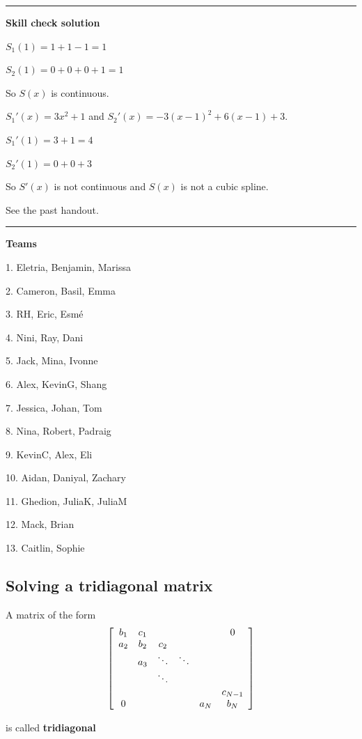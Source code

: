 \documentclass[12pt,letterpaper,noanswers]{exam}
\begin{document}
\vspace{0.2cm}
\hrule
\vspace{0.2cm}

\noindent \textbf{Skill check solution}
\begin{questions}
\item 

$S_1(1) = 1+1-1 = 1$

$S_2(1) = 0 + 0 + 0 + 1 = 1$

So $S(x)$ is continuous.

$S_1'(x) = 3x^2 + 1$ and $S_2'(x) = -3(x-1)^2 + 6(x-1) + 3$.

$S_1'(1) = 3 + 1 = 4$

$S_2'(1) = 0 + 0 + 3$

So $S'(x)$ is not continuous and $S(x)$ is not a cubic spline.

\item See the past handout.
\end{questions}
\vspace{0.2cm}
\hrule
\vspace{0.2cm}

\noindent \textbf{Teams}
\begin{multicols}{3}
1. Eletria, Benjamin, Marissa

2. Cameron, Basil, Emma

3. RH, Eric, Esmé

4. Nini, Ray, Dani

5. Jack, Mina, Ivonne

6. Alex, KevinG, Shang

7. Jessica, Johan, Tom

8. Nina, Robert, Padraig

9. KevinC, Alex, Eli

10.  Aidan, Daniyal, Zachary

11. Ghedion, JuliaK, JuliaM

12. Mack, Brian

13. Caitlin, Sophie

\end{multicols}

\subsection*{Solving a tridiagonal matrix}


\begin{tcolorbox}
A matrix of the form \[\left[\begin{array}{ c c c c c c } 
b_1 & c_1 &  &  & & 0 \\
a_2 & b_2 & c_2 &  &  &  \\
 & a_3 & \ddots & \ddots &  &  \\
 &  &\ddots &  &  & \\
  &  & &  &  & c_{N-1}\\
0 & & & & a_N & b_N
\end{array}\right]\]

is called \textbf{tridiagonal}
\end{tcolorbox}
\end{document}
